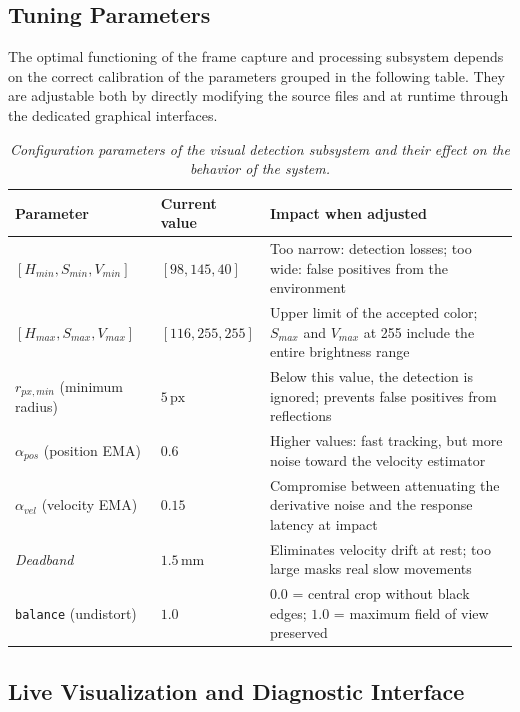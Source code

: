 \documentclass[12pt,a4paper]{report}
\begin{document}
\subsection{Tuning Parameters}

The optimal functioning of the frame capture and processing subsystem depends on the correct calibration of the parameters grouped in the following table. They are adjustable both by directly modifying the source files and at runtime through the dedicated graphical interfaces.

\begin{table}[H]
\centering
\begin{tabularx}{\textwidth}{|X|X|X|}
\hline
\textbf{Parameter} & \textbf{Current value} & \textbf{Impact when adjusted} \\ \hline
$[H_{min}, S_{min}, V_{min}]$ & $[98, 145, 40]$ & Too narrow: detection losses; too wide: false positives from the environment \\ \hline
$[H_{max}, S_{max}, V_{max}]$ & $[116, 255, 255]$ & Upper limit of the accepted color; $S_{max}$ and $V_{max}$ at 255 include the entire brightness range \\ \hline
$r_{px,min}$ (minimum radius) & $5\,\text{px}$ & Below this value, the detection is ignored; prevents false positives from reflections \\ \hline
$\alpha_{pos}$ (position EMA) & $0.6$ & Higher values: fast tracking, but more noise toward the velocity estimator \\ \hline
$\alpha_{vel}$ (velocity EMA) & $0.15$ & Compromise between attenuating the derivative noise and the response latency at impact \\ \hline
\textit{Deadband} & $1.5\,\text{mm}$ & Eliminates velocity drift at rest; too large masks real slow movements \\ \hline
\texttt{balance} (undistort) & $1.0$ & $0.0$ = central crop without black edges; $1.0$ = maximum field of view preserved \\ \hline
\end{tabularx}
\caption{\textit{Configuration parameters of the visual detection subsystem and their effect on the behavior of the system.}}
\end{table}

\subsection{Live Visualization and Diagnostic Interface}
\end{document}
